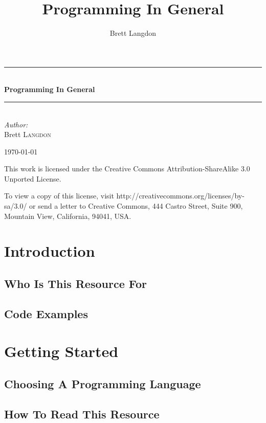 \documentclass[10pt,a4paper,titlepage]{book}
\author{Brett Langdon}
\title{Programming In General}
\newcommand{\HRule}{\rule{\linewidth}{0.5mm}}
\begin{document}
\begin{titlepage}
\begin{center}

\vspace*{3 in}

\HRule \\[0.4cm]
{\huge \bfseries Programming In General}
\HRule \\[0.4cm]

\emph{Author:}\\
Brett \textsc{Langdon}

\vfill

{\large \today}

\end{center}
\end{titlepage}

\null
\vfill
This work is licensed under the Creative Commons Attribution-ShareAlike 3.0 Unported License.
\par
To view a copy of this license, visit http://creativecommons.org/licenses/by-sa/3.0/ or send a letter to Creative Commons, 444 Castro Street, Suite 900, Mountain View, California, 94041, USA.
\vfill
\null

\tableofcontents

\chapter{Introduction}

\vfill
\pagebreak
\section{Who Is This Resource For}

\vfill
\pagebreak
\section{Code Examples}

\vfill
\pagebreak
\chapter{Getting Started}

\vfill
\pagebreak
\section{Choosing A Programming Language}

\vfill
\pagebreak
\section{How To Read This Resource}

\vfill
\pagebreak
\end{document}
